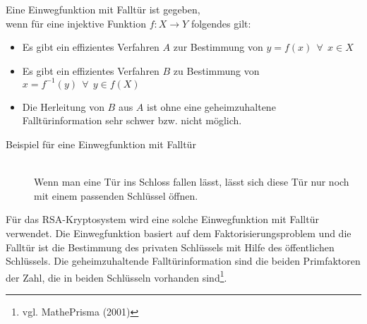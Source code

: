 \begin{Einweg}
\label{Def_Einweg_Backdoor}
Eine Einwegfunktion mit Falltür ist gegeben,\\
wenn für eine injektive Funktion \(f:X\rightarrow Y\) folgendes gilt:
\begin{itemize}
\item Es gibt ein effizientes Verfahren $A$ zur Bestimmung von $y=f(x)~~\forall~~x \in X $
\item Es gibt ein effizientes Verfahren $B$ zu Bestimmung von $x=f^{-1}(y)~~\forall~~y \in f(X)$
\item Die Herleitung von $B$ aus $A$ ist  ohne eine geheimzuhaltene\\Falltürinformation sehr schwer bzw. nicht möglich.
\end{itemize}
\end{Einweg}
\hfill
\begin{description}
\item[Beispiel für eine Einwegfunktion mit Falltür]\hfill \\
Wenn man eine Tür ins Schloss fallen lässt, lässt sich diese Tür nur noch mit einem passenden Schlüssel öffnen.
\end{description}
Für das RSA-Kryptosystem wird eine solche Einwegfunktion mit Falltür verwendet. Die Einwegfunktion basiert auf dem Faktorisierungsproblem und die Falltür ist die Bestimmung des privaten Schlüssels mit Hilfe des öffentlichen Schlüssels. Die geheimzuhaltende Falltürinformation sind die beiden Primfaktoren der Zahl, die in beiden Schlüsseln vorhanden sind\footnote{vgl. MathePrisma (2001)}.
